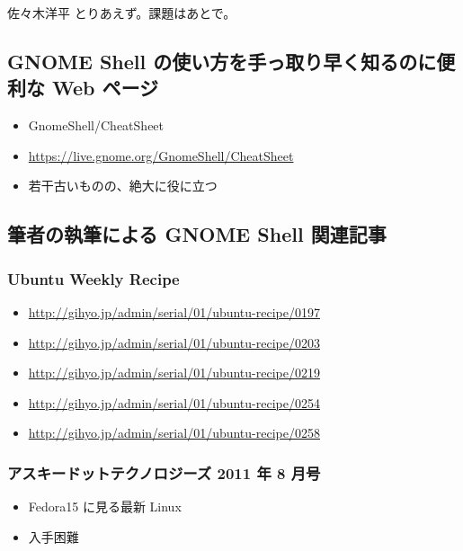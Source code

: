 \documentclass[mingoth,a4paper]{jsarticle}
\begin{document}
\begin{prework}{佐々木洋平}
  とりあえず。課題はあとで。
\end{prework}


\vspace{1em}

\subsection{GNOME Shell の使い方を手っ取り早く知るのに便利な Web ページ}
\begin{itemize}
  \item GnomeShell/CheatSheet
  \item \url{https://live.gnome.org/GnomeShell/CheatSheet}
  \item 若干古いものの、絶大に役に立つ
\end{itemize}

\subsection{筆者の執筆による GNOME Shell 関連記事}
\subsubsection{Ubuntu Weekly Recipe}
\begin{itemize}
  \item \url{http://gihyo.jp/admin/serial/01/ubuntu-recipe/0197}
  \item \url{http://gihyo.jp/admin/serial/01/ubuntu-recipe/0203}
  \item \url{http://gihyo.jp/admin/serial/01/ubuntu-recipe/0219}
  \item \url{http://gihyo.jp/admin/serial/01/ubuntu-recipe/0254}
  \item \url{http://gihyo.jp/admin/serial/01/ubuntu-recipe/0258}
\end{itemize}

\subsubsection{アスキードットテクノロジーズ 2011 年 8 月号}
\begin{itemize}
  \item Fedora15 に見る最新 Linux
  \item 入手困難
\end{itemize}
\end{document}

